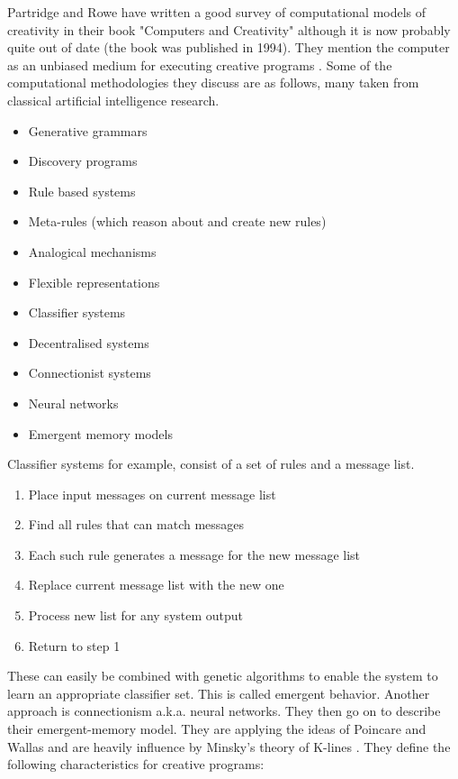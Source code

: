 Partridge and Rowe have written a good survey of computational models of creativity in their book "Computers and Creativity" \citep{Partridge1994} although it is now probably quite out of date (the book was published in 1994). They mention the computer as an unbiased medium for executing creative programs \citep[p.26]{Partridge1994}. Some of the computational methodologies they discuss are as follows, many taken from classical artificial intelligence research.

\begin{itemize}
  \item Generative  grammars
  \item Discovery programs
  \item Rule based systems
  \item Meta-rules (which reason about and create new rules)
  \item Analogical mechanisms
  \item Flexible representations
  \item Classifier systems
  \item Decentralised systems
  \item Connectionist systems
  \item Neural networks
  \item Emergent memory models
\end{itemize}

Classifier systems for example, consist of a set of rules and a message list.

\begin{enumerate}
  \item Place input messages on current message list
  \item Find all rules that can match messages
  \item Each such rule generates a message for the new message list
  \item Replace current message list with the new one
  \item Process new list for any system output
  \item Return to step 1
\end{enumerate}

These can easily be combined with genetic algorithms to enable the system to learn an appropriate classifier set. This is called emergent behavior. Another approach is connectionism a.k.a. neural networks. They then go on to describe their emergent-memory model. They are applying the ideas of Poincare and Wallas and are heavily influence by Minsky's theory of K-lines \citep{Minsky1980, Minsky1988}. They define the following characteristics for creative programs:

